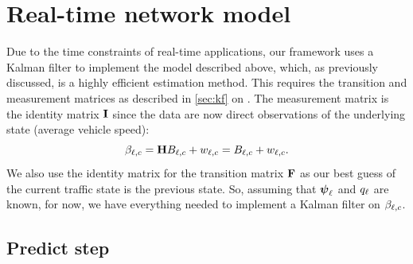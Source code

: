 \section{Real-time network model}
\label{sec:nw_realtime}

Due to the time constraints of real-time applications, our framework uses a Kalman filter to implement the model described above, which, as previously discussed, is a highly efficient estimation method. This requires the transition and measurement matrices as described in \cref{sec:kf} on . The measurement matrix is the identity matrix $\mathbf{I}$ since the data are now direct observations of the underlying state (average vehicle speed):
\begin{equation}
\label{eq:kf_meas_identity}
\beta_{\ell,c} = \mathbf{H}B_{\ell,c} + w_{\ell,c} = B_{\ell,c} + w_{\ell,c}.
\end{equation}
We also use the identity matrix for the transition matrix $\mathbf{F}$ as our best guess of the current traffic state is the previous state. So, assuming that $\mathbf{\boldsymbol{\psi}}_{\ell}$ and $q_{\ell}$ are known, for now, we have everything needed to implement a Kalman filter on $\beta_{\ell,c}$.


\subsection{Predict step}
\label{sec:kf_predict}

